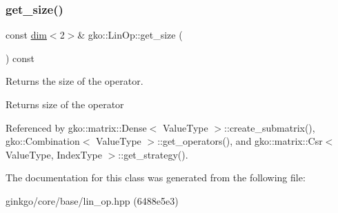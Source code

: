 \subsubsection{\texorpdfstring{get\+\_\+size()}{get\_size()}}
{\footnotesize\ttfamily const \hyperlink{structgko_1_1dim}{dim}$<$2$>$\& gko\+::\+Lin\+Op\+::get\+\_\+size (\begin{DoxyParamCaption}{ }\end{DoxyParamCaption}) const\hspace{0.3cm}{\ttfamily [noexcept]}}



Returns the size of the operator. 

\begin{DoxyReturn}{Returns}
size of the operator 
\end{DoxyReturn}


Referenced by gko\+::matrix\+::\+Dense$<$ Value\+Type $>$\+::create\+\_\+submatrix(), gko\+::\+Combination$<$ Value\+Type $>$\+::get\+\_\+operators(), and gko\+::matrix\+::\+Csr$<$ Value\+Type, Index\+Type $>$\+::get\+\_\+strategy().



The documentation for this class was generated from the following file\+:\begin{DoxyCompactItemize}
\item 
ginkgo/core/base/lin\+\_\+op.\+hpp (6488e5e3)\end{DoxyCompactItemize}
